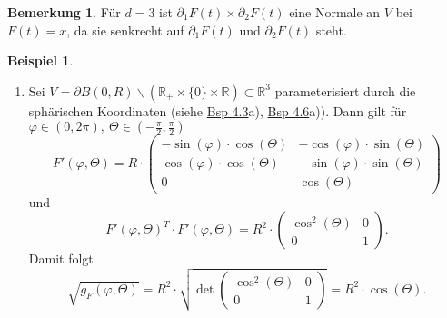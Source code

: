 \documentclass[a4paper]{report}
\newcommand{\R}{\mathbb{R}}
\newcommand{\jlabel}[1]{\label{j_#1}}
\newcommand{\jhyperref}[2]{\hyperref[j_#1]{#2}}
\newcommand{\jlink}[1]{\jhyperref{#1}{#1}}
\theoremstyle{plain}
\theoremstyle{definition}
\newtheorem{expl}[thm]{Beispiel}
\newtheorem*{bem*}{Bemerkung}
\begin{document}
{{{{\begin{bem*}
    Für $d=3$ ist $\partial_1 F(t) \times \partial_2 F(t)$ eine Normale an $V$ bei $F(t)=x$, da sie senkrecht auf $\partial_1 F(t)$ und  $\partial_2 F(t)$ steht.
\end{bem*}

\jlabel{Bsp 4.9}
\begin{expl}
    \begin{enumerate}
        \item 
            \jlabel{Bsp 4.9a)}
            Sei $V = \partial B(0,R) \backslash (\R_+ \times \{0\} \times \R) \subset \R^3$ parameterisiert durch die sphärischen Koordinaten (siehe \jlink{Bsp 4.3}a), \jlink{Bsp 4.6}a)). Dann gilt für $\varphi \in (0,2\pi), \ \Theta \in (-\frac{\pi}{2},\frac{\pi}{2})$
            \[
                F'(\varphi, \Theta) = R \cdot \begin{pmatrix}
                                                 -\sin(\varphi)\cdot \cos(\Theta)  &  -\cos(\varphi)\cdot \sin(\Theta) \\
                                                 \cos(\varphi)\cdot \cos(\Theta)   &  -\sin(\varphi)\cdot \sin(\Theta) \\
                                                 0                                 &   \cos(\Theta)
                                             \end{pmatrix}
            \]
            und
            \[
                F'(\varphi,\Theta)^T\cdot F'(\varphi,\Theta) = R^2\cdot \begin{pmatrix}
                                                                            \cos^2(\Theta) & 0 \\
                                                                            0              & 1
                                                                        \end{pmatrix}.
            \]
            Damit folgt
            \[
                \sqrt{g_F(\varphi, \Theta)} = R^2 \cdot \sqrt{\det \begin{pmatrix}
                                                                        \cos^2(\Theta) & 0 \\
                                                                        0              & 1
                                                                    \end{pmatrix}} = R^2\cdot \cos(\Theta).
            \]
            

\end{enumerate}
\end{expl}}}}}
\end{document}
